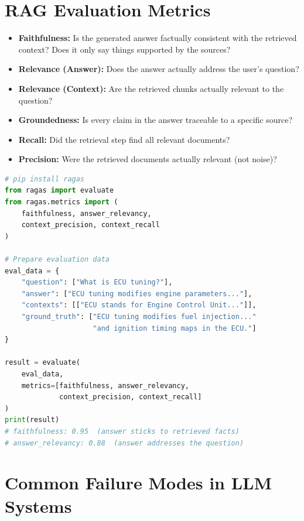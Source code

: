 \documentclass[12pt, a4paper, oneside]{book}
\begin{document}
\section{RAG Evaluation Metrics}

\begin{itemize}[leftmargin=2em]
    \item \textbf{Faithfulness:} Is the generated answer factually consistent with the retrieved context? Does it only say things supported by the sources?
    \item \textbf{Relevance (Answer):} Does the answer actually address the user's question?
    \item \textbf{Relevance (Context):} Are the retrieved chunks actually relevant to the question?
    \item \textbf{Groundedness:} Is every claim in the answer traceable to a specific source?
    \item \textbf{Recall:} Did the retrieval step find all relevant documents?
    \item \textbf{Precision:} Were the retrieved documents actually relevant (not noise)?
\end{itemize}

\begin{lstlisting}[language=Python, caption={RAG evaluation with RAGAS}]
# pip install ragas
from ragas import evaluate
from ragas.metrics import (
    faithfulness, answer_relevancy,
    context_precision, context_recall
)

# Prepare evaluation data
eval_data = {
    "question": ["What is ECU tuning?"],
    "answer": ["ECU tuning modifies engine parameters..."],
    "contexts": [["ECU stands for Engine Control Unit..."]],
    "ground_truth": ["ECU tuning modifies fuel injection..."
                     "and ignition timing maps in the ECU."]
}

result = evaluate(
    eval_data,
    metrics=[faithfulness, answer_relevancy,
             context_precision, context_recall]
)
print(result)
# faithfulness: 0.95  (answer sticks to retrieved facts)
# answer_relevancy: 0.88  (answer addresses the question)
\end{lstlisting}

\section{Common Failure Modes in LLM Systems}
\end{document}
